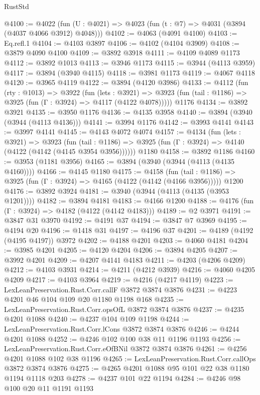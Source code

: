 \begin{lexlean}{RustStd}
\begin{coremodule}
@4100 := @4022 (fun (U : @4021) => @4023 (fun (t : @7) => @4031 (@3894 (@4037 @4066 @3912) @4048)))
@4102 := @4063 (@4091 @4100)
@4103 := Eq.refl.{1}
@4104 := @4103 @3897
@4106 := @4102 (@4104 @3909)
@4108 := @3879 @4090 @4100
@4109 := @3892 @3918
@4111 := @4109 @4089 @1173
@4112 := @3892 @1013
@4113 := @3946 @1173
@4115 := @3944 (@4113 @3959)
@4117 := @3894 (@3940 @4115)
@4118 := @3981 @1173
@4119 := @4067 @4118
@4120 := @3965 @4119
@4122 := @3894 (@4120 @3986)
@4133 := @4112
    (fun (rty : @1013) =>
    @3922
      (fun (lets : @3921) =>
      @3923 (fun (tail : @1186) => @3925 (fun (Γ : @3924) => @4117 (@4122 @4078)))))
    @1176
@4134 := @3892 @3921
@4135 := @3950 @1176
@4136 := @4135 @3958
@4140 := @3894 (@3940 (@3944 (@4113 @4136)))
@4141 := @3994 @1176
@4142 := @3993 @4141
@4143 := @3997 @4141
@4145 := @4143 @4072 @4074
@4157 := @4134
    (fun (lets : @3921) =>
    @3923
      (fun (tail : @1186) => @3925 (fun (Γ : @3924) => @4140 (@4122 (@4142 (@4145 @3954 @3956))))))
    @1180
@4158 := @3892 @1186
@4160 := @3953 (@1181 @3956)
@4165 := @3894 (@3940 (@3944 (@4113 (@4135 @4160))))
@4166 := @4145 @1180
@4175 := @4158
    (fun (tail : @1186) => @3925 (fun (Γ : @3924) => @4165 (@4122 (@4142 (@4166 @3956)))))
    @1200
@4176 := @3892 @3924
@4181 := @3940 (@3944 (@4113 (@4135 (@3953 @1201))))
@4182 := @3894 @4181
@4183 := @4166 @1200
@4188 := @4176 (fun (Γ : @3924) => @4182 (@4122 (@4142 @4183)))
@4189 := @2 @3971
@4191 := @3847 @31 @3970
@4192 := @4191 @37
@4194 := @3847 @7 @3969
@4195 := @4194 @20
@4196 := @1418 @31
@4197 := @4196 @37
@4201 := @4189 (@4192 (@4195 @4197)) @3972
@4202 := @4188 @4201
@4203 := @4060 @4181
@4204 := @3985 @4201
@4205 := @4120 @4204
@4206 := @3894 @4205
@4207 := @3992 @4201
@4209 := @4207 @4141 @4183
@4211 := @4203 (@4206 @4209)
@4212 := @4103 @3931
@4214 := @4211 (@4212 @3939)
@4216 := @4060 @4205 @4209
@4217 := @4103 @3964
@4219 := @4216 (@4217 @4119)
@4223 := LexLeanPreservation.Rust.Corr.callF @3872 @3874 @3876
@4231 := @4223 @4201 @46 @104 @109 @20 @1180 @1198 @168
@4235 := LexLeanPreservation.Rust.Corr.opsOfL @3872 @3874 @3876
@4237 := @4235 @4201 @1088
@4240 := @4237 @104 @109 @1198
@4244 := LexLeanPreservation.Rust.Corr.lCons @3872 @3874 @3876
@4246 := @4244 @4201 @1088
@4252 := @4246 @102 @100 @38 @11 @1196 @1193
@4256 := LexLeanPreservation.Rust.Corr.eOfBNil @3872 @3874 @3876
@4261 := @4256 @4201 @1088 @102 @38 @1196
@4265 := LexLeanPreservation.Rust.Corr.callOps @3872 @3874 @3876
@4275 := @4265 @4201 @1088 @95 @101 @22 @38 @1180 @1194 @1118 @203
@4278 := @4237 @101 @22 @1194
@4284 := @4246 @98 @100 @20 @11 @1191 @1193

\end{coremodule}
\end{lexlean}
